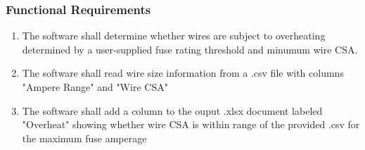 \subsubsection{Functional Requirements}
\begin{enumerate}


\item The software shall determine whether wires are subject to overheating determined by a user-supplied fuse rating threshold and minumum wire CSA.
\item The software shall read wire size information from a .csv file with columns "Ampere Range" and "Wire CSA"

\item The software shall add a column to the ouput .xlsx document labeled "Overheat" showing whether wire CSA is within range of the provided .csv for the maximum fuse amperage

\end{enumerate}


 
 
